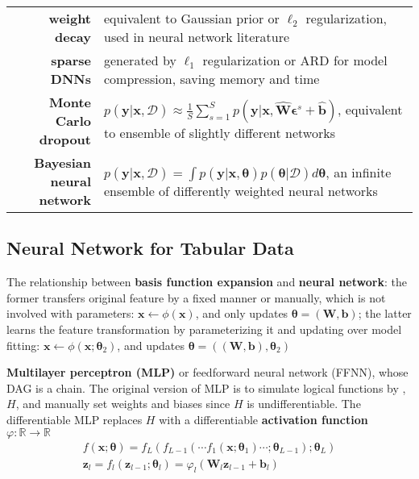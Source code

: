 \begin{table}[htpb]
{\begin{tabular}{rp{28em}}
        \textbf{weight decay} & equivalent to Gaussian prior or $\ell_2$ regularization, used in neural network literature \\
        \textbf{sparse DNNs} & generated by $\ell_1$ regularization or ARD for model compression, saving memory and time \\
        \textbf{Monte Carlo dropout} & $p(\bm{y}|\bm{x},\mathcal{D})\approx\frac{1}{S}\sum_{s=1}^S p(\bm{y}|\bm{x},\hat{\mathbf{W}}\bm{\epsilon}^s+\hat{\bm{b}})$, equivalent to ensemble of slightly different networks \\
        \textbf{Bayesian neural network} & $p(\bm{y}|\bm{x},\mathcal{D})=\int{p(\bm{y}|\bm{x},\bm{\theta})p(\bm{\theta}|\mathcal{D})}d\bm{\theta}$, an infinite ensemble of differently weighted neural networks \\
        \bottomrule
    \end{tabular}}
    \label{tab:newtermnetwork}
\end{table}




\subsection{Neural Network for Tabular Data}

The relationship between \textbf{basis function expansion} and \textbf{neural network}:
the former transfers original feature by a fixed manner or manually, 
which is not involved with parameters:
$\bm{x} \leftarrow \phi(\bm{x})$, and only updates $\bm{\theta}=(\mathbf{W},\bm{b})$; 
the latter learns the feature transformation by parameterizing it and updating 
over model fitting: $\bm{x} \leftarrow \phi(\bm{x};\bm{\theta}_2)$, 
and updates $\bm{\theta}=((\mathbf{W},\bm{b}),\bm{\theta}_2)$

\textbf{Multilayer perceptron (MLP)} or feedforward neural network (FFNN), whose DAG is a chain. The original version of MLP is to simulate logical functions by , $H$, and manually set weights and biases since $H$ is undifferentiable. 
The differentiable MLP replaces $H$ with a differentiable \textbf{activation function}
$\varphi:\mathbb{R}\to\mathbb{R}$
\begin{gather}
    f(\bm{x};\bm{\theta})
    = f_L(f_{L-1}(\cdots f_1(\bm{x};\bm{\theta}_1)\cdots;\bm{\theta}_{L-1});\bm{\theta}_L)\\
    \bm{z}_l=f_l(\bm{z}_{l-1};\bm{\theta}_l)=\varphi_l(\mathbf{W}_l\bm{z}_{l-1}+\bm{b}_l)
\end{gather}



